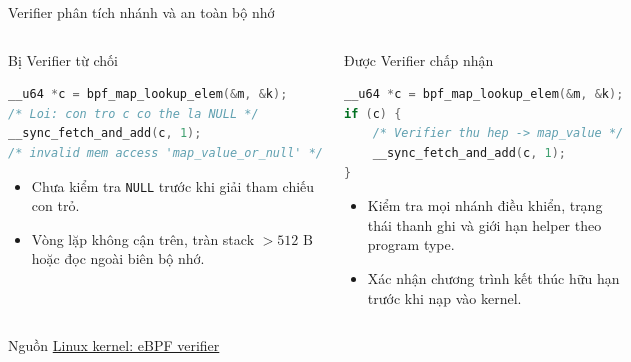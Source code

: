 \begin{frame}[fragile]{Verifier phân tích nhánh và an toàn bộ nhớ}
  \begin{columns}[T,onlytextwidth]
    \begin{alertblock}{Bị Verifier từ chối}
      \begin{lstlisting}[language=C,style=dense]
__u64 *c = bpf_map_lookup_elem(&m, &k);
/* Loi: con tro c co the la NULL */
__sync_fetch_and_add(c, 1);
/* invalid mem access 'map_value_or_null' */
\end{lstlisting}
      \footnotesize
      \begin{itemize}
        \item Chưa kiểm tra \texttt{NULL} trước khi giải tham chiếu con trỏ.
        \item Vòng lặp không cận trên, tràn stack $> 512\text{ B}$ hoặc đọc ngoài biên bộ nhớ.
      \end{itemize}
    \end{alertblock}

    \begin{block}{Được Verifier chấp nhận}
      \begin{lstlisting}[language=C,style=dense]
__u64 *c = bpf_map_lookup_elem(&m, &k);
if (c) {
    /* Verifier thu hep -> map_value */
    __sync_fetch_and_add(c, 1);
}
\end{lstlisting}
      \footnotesize
      \begin{itemize}
        \item Kiểm tra mọi nhánh điều khiển, trạng thái thanh ghi và giới hạn helper theo program type.
        \item Xác nhận chương trình kết thúc hữu hạn trước khi nạp vào kernel.
      \end{itemize}
    \end{block}
  \end{columns}
  \medskip

  \smallskip
  {\scriptsize Nguồn \href{https://docs.kernel.org/bpf/verifier.html}{Linux kernel: eBPF verifier}}
\end{frame}

